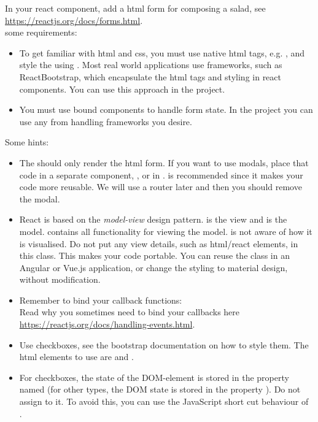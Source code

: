 \documentclass[fleqn, article, a4paper]{memoir}
\begin{document}
\begin{Assignments}
\item In your  react component, add a html form for composing a salad, see \url{https://reactjs.org/docs/forms.html}.\\
\noindent some requirements:
\begin{itemize}
  \item To get familiar with html and css, you must use native html tags, e.g. , and style the using . Most real world applications use frameworks, such as ReactBootstrap, which encapsulate the html tags and styling in react components. You can use this approach in the project.
  \item You must use bound components to handle form state. In the project you can use any from handling frameworks you desire.
\end{itemize}
\noindent Some hints:
\begin{itemize}
  \item The  should only render the html form. If you want to use modals, place that code in a separate component, , or in .  is recommended since it makes your code more reusable. We will use a router later and then you should remove the modal.
  \item React is based on the \emph{model-view} design pattern.  is the view and  is the model.  contains all functionality for viewing the model.  is not aware of how it is visualised. Do not put any view details, such as html/react elements, in this class. This makes your code portable. You can reuse the  class in an Angular or Vue.js application, or change the styling to material design, without modification.
  \item Remember to bind your callback functions:\\  Read why you sometimes need to bind your callbacks here \url{https://reactjs.org/docs/handling-events.html}.
  \item Use checkboxes, see the bootstrap documentation on how to style them. The html elements to use are  and .
  \item For checkboxes, the state of the DOM-element is stored in the property named  (for other  types, the DOM state is stored in the property ). Do not assign  to it. To avoid this, you can use the JavaScript short cut behaviour of \code{||} \\ .

\end{itemize}
\end{Assignments}
\end{document}
